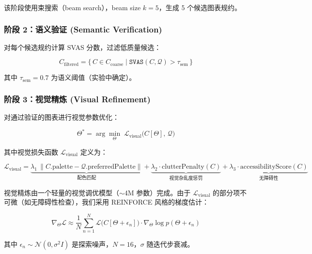 \documentclass[12pt,a4paper]{ctexart}
\theoremstyle{remark}
\newcommand{\SVAS}{\texttt{SVAS}}
\begin{document}
该阶段使用束搜索（beam search），beam size $k = 5$，生成 5 个候选图表规约。

\subsubsection{阶段 2：语义验证 (Semantic Verification)}

对每个候选规约计算 SVAS 分数，过滤低质量候选：

\begin{equation}
    C_{\text{filtered}} = \{\, C \in C_{\text{coarse}} \mid \SVAS(C, \mathcal{Q}) > \tau_{\text{sem}} \,\}
\end{equation}

其中 $\tau_{\text{sem}} = 0.7$ 为语义阈值（实验中确定）。

\subsubsection{阶段 3：视觉精炼 (Visual Refinement)}

对通过验证的图表进行视觉参数优化：

\begin{equation}
    \Theta^* = \arg\min_{\Theta} \; \mathcal{L}_{\text{visual}}\big(C[\Theta],\, \mathcal{Q}\big)
\end{equation}

其中视觉损失函数 $\mathcal{L}_{\text{visual}}$ 定义为：

\begin{equation}\label{eq:visloss}
    \mathcal{L}_{\text{visual}} =
    \underbrace{\lambda_1\, \|C.\text{palette} - \mathcal{Q}.\text{preferredPalette}\|}_{\text{配色匹配}}
    + \underbrace{\lambda_2 \cdot \text{clutterPenalty}(C)}_{\text{视觉杂乱度惩罚}}
    + \underbrace{\lambda_3 \cdot \text{accessibilityScore}(C)}_{\text{无障碍性}}
\end{equation}

视觉精炼由一个轻量的视觉调优模型（$\sim$4M 参数）完成。由于 $\mathcal{L}_{\text{visual}}$ 的部分项不可微（如无障碍性检查），我们采用 REINFORCE 风格的梯度估计：

\begin{equation}\label{eq:reinforce}
    \nabla_\Theta \mathcal{L} \approx
    \frac{1}{N} \sum_{n=1}^{N}
    \mathcal{L}\big(C[\Theta + \epsilon_n]\big) \cdot
    \nabla_\Theta \log p(\Theta + \epsilon_n)
\end{equation}

其中 $\epsilon_n \sim \mathcal{N}(0, \sigma^2 I)$ 是探索噪声，$N = 16$，$\sigma$ 随迭代步衰减。
\end{document}
